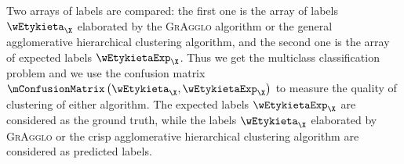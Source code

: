 \documentclass{amcs}
\newcommand{\procedura}[1]{\textsc{#1}}
\newcommand{\MojAlg}{\procedura{GrAgglo}}
\newcommand{\relS}{S}
\newcommand{\eqS}{=_\relS}
\begin{document}

Two arrays of labels are compared: the first one is the array of labels $\wEtykieta_\X$ elaborated by the \MojAlg{} algorithm or the general agglomerative hierarchical clustering algorithm, and the second one is the array of expected labels $\wEtykietaExp_\X$.
Thus we get the multiclass classification problem and we use the confusion matrix $\mConfusionMatrix \left(\wEtykieta_\X, \wEtykietaExp_\X\right)$ to measure the quality of clustering of either algorithm. 
The expected labels $\wEtykietaExp_\X$ are considered as the ground truth, while the labels $\wEtykieta_\X$ elaborated by \MojAlg{} or the crisp agglomerative hierarchical clustering algorithm are considered as predicted labels.
\end{document}
